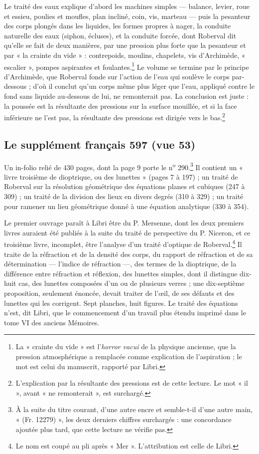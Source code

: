 \documentclass[11pt,a4paper]{article}
\begin{document}
Le traité des eaux explique d'abord les machines simples — balance, levier,
roue et essieu, poulies et moufles, plan incliné, coin, vis, marteau — puis
la pesanteur des corps plongés dans les liquides, les formes propres à nager,
la conduite naturelle des eaux (siphon, écluses), et la conduite forcée, dont
Roberval dit qu'elle se fait de deux manières, par une pression plus forte
que la pesanteur et par « la crainte du vide » : contrepoids, moulins,
chapelets, vis d'Archimède, « escalier », pompes aspirantes et
foulantes.\footnote{La « crainte du vide » est l'\emph{horror vacui} de la
physique ancienne, que la pression atmosphérique a remplacée comme
explication de l'aspiration ; le mot est celui du manuscrit, rapporté par
Libri.} Le volume se termine par le principe d'Archimède, que Roberval fonde
sur l'action de l'eau qui soulève le corps par-dessous ; d'où il conclut qu'un
corps même plus léger que l'eau, appliqué contre le fond sans liquide
au-dessous de lui, ne remonterait pas. La conclusion est juste : la poussée
est la résultante des pressions sur la surface mouillée, et si la face
inférieure ne l'est pas, la résultante des pressions est dirigée vers le
bas.\footnote{L'explication par la résultante des pressions est de cette
lecture. Le mot « il », avant « ne remonterait », est surchargé.}

\subsection*{Le supplément français 597 (vue 53)}

Un in-folio relié de 430 pages, dont la page 9 porte le
n\textsuperscript{o} 290.\footnote{À la suite du titre courant, d'une autre
encre et semble-t-il d'une autre main, « (Fr. 12279) », les deux derniers
chiffres surchargés : une concordance ajoutée plus tard, que cette lecture ne
vérifie pas.} Il contient un « livre troisième de dioptrique, ou des
lunettes » (pages 7 à 197) ; un traité de Roberval sur la résolution
géométrique des équations planes et cubiques (247 à 309) ; un traité de la
division des lieux en divers degrés (310 à 329) ; un traité pour ramener un
lieu géométrique donné à une équation analytique (330 à 354).

Le premier ouvrage paraît à Libri être du P. Mersenne, dont les deux premiers
livres auraient été publiés à la suite du traité de perspective du P. Niceron,
et ce troisième livre, incomplet, être l'analyse d'un traité d'optique de
Roberval.\footnote{Le nom est coupé au pli après « Mer ». L'attribution est
celle de Libri.} Il traite de la réfraction et de la densité des corps, du
rapport de réfraction et de sa détermination — l'indice de réfraction —, des
termes de la dioptrique, de la différence entre réfraction et réflexion, des
lunettes simples, dont il distingue dix-huit cas, des lunettes composées d'un
ou de plusieurs verres ; une dix-septième proposition, seulement énoncée,
devait traiter de l'œil, de ses défauts et des lunettes qui les corrigent.
Sept planches, huit figures. Le traité des équations n'est, dit Libri, que le
commencement d'un travail plus étendu imprimé dans le tome VI des anciens
Mémoires.
\end{document}

